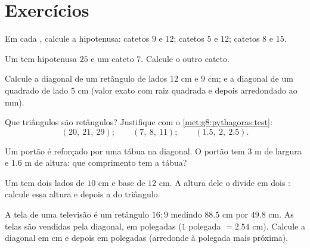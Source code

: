 \section{Exercícios}

\begin{exercise}[$\star$]\label{exo:g8:pythagoras:1}
Em cada , calcule a hipotenusa: catetos $9$ e $12$;
\quad catetos $5$ e $12$; \quad catetos $8$ e $15$.
\end{exercise}

\begin{exercise}[$\star$]\label{exo:g8:pythagoras:2}
Um  tem hipotenusa $25$ e um cateto $7$. Calcule o
outro cateto.
\end{exercise}

\begin{exercise}[$\star$]\label{exo:g8:pythagoras:3}
Calcule a diagonal de um retângulo de lados $12$ cm e $9$ cm; e a
diagonal de um quadrado de lado $5$ cm (valor exato com raiz quadrada
e depois arredondado ao mm).
\end{exercise}

\begin{exercise}[$\star$]\label{exo:g8:pythagoras:4}
Que triângulos são retângulos? Justifique com o
\cref{met:g8:pythagoras:test}:
\[
(20,\ 21,\ 29); \qquad
(7,\ 8,\ 11); \qquad
(1.5,\ 2,\ 2.5).
\]
\end{exercise}

\begin{exercise}[$\star$]\label{exo:g8:pythagoras:5}
Um portão é reforçado por uma tábua na diagonal. O portão tem $3$ m de
largura e $1.6$ m de altura: que comprimento tem a tábua?
\end{exercise}

\begin{exercise}[$\star$]\label{exo:g8:pythagoras:6}
Um  tem dois lados de $10$ cm e base de $12$ cm. A
altura dele o divide em dois : calcule essa altura
e depois a  do triângulo.
\end{exercise}

\begin{exercise}[$\star\star$]\label{exo:g8:pythagoras:7}
A tela de uma televisão é um retângulo $16{:}9$ medindo $88.5$ cm por
$49.8$ cm. As telas são vendidas pela diagonal, em polegadas ($1$
polegada $= 2.54$ cm). Calcule a diagonal em cm e depois em polegadas
(arredonde à polegada mais próxima).
\end{exercise}

